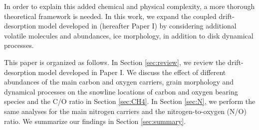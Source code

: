 \documentclass[apj]{emulateapj}
\newcommand{\emgr}[1]{\emph{ \color{gray} #1}}
\begin{document}

In order to explain this added chemical and physical complexity, a more thorough theoretical framework is needed. In this work, we expand the coupled drift-desorption model developed in \citet{piso15b} (hereafter Paper I) by considering additional volatile molecules and abundances, ice morphology, in addition to disk dynamical processes. 

This paper is organized as follows. In Section \ref{sec:review}, we review the drift-desorption model developed in Paper I. We discuss the effect of different abundances of the main carbon and oxygen carriers, grain morphology and dynamical processes on the snowline locations of carbon and oxygen bearing species and the C/O ratio in Section \ref{sec:CH4}. In Section \ref{sec:N}, we perform the same analyses for the main nitrogen carriers and the nitrogen-to-oxygen (N/O) ratio. We summarize our findings in Section \ref{sec:summary}.  


\end{document}

